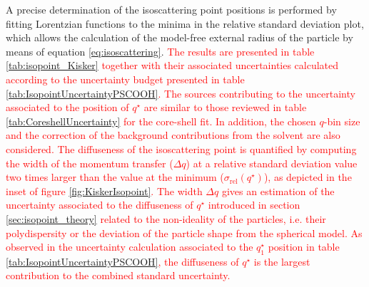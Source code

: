A precise determination of the isoscattering point positions is performed by fitting Lorentzian functions to the minima in the relative standard deviation plot, which allows the calculation of the model-free external radius of the particle by means of equation \eqref{eq:isoscattering}. \textcolor{red}{The results are presented in table \ref{tab:isopoint_Kisker} together with their associated uncertainties calculated according to the uncertainty budget presented in table \ref{tab:IsopointUncertaintyPSCOOH}. The sources contributing to the uncertainty associated to the position of $q^{\star}$ are similar to those reviewed in table \ref{tab:CoreshellUncertainty} for the core-shell fit. In addition, the chosen $q$-bin size and the correction of the background contributions from the solvent are also considered. The diffuseness of the isoscattering point is quantified by computing the width of the momentum transfer ($\Delta q$) at a relative standard deviation value two times larger than the value at the minimum ($\sigma_{\text{rel}}(q^{\star})$), as depicted in the inset of figure \ref{fig:KiskerIsopoint}. The width $\Delta q$ gives an estimation of the uncertainty associated to the diffuseness of $q^{\star}$ introduced in section \ref{sec:isopoint_theory} related to the non-ideality of the particles, i.e. their polydispersity or the deviation of the particle shape from the spherical model. As observed in the uncertainty calculation associated to the $q_1^{\star}$ position in table \ref{tab:IsopointUncertaintyPSCOOH}, the diffuseness of $q^{\star}$ is the largest contribution to the combined standard uncertainty.} 

